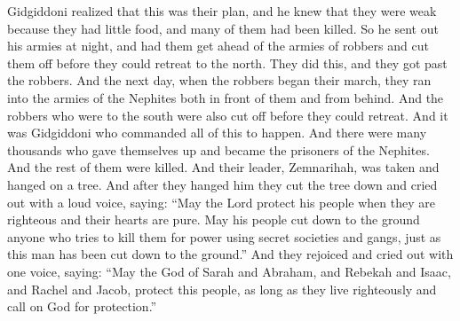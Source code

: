 Gidgiddoni realized that this was their plan, and he knew that they were weak because they had little food, and many of them had been killed. So he sent out his armies at night, and had them get ahead of the armies of robbers and cut them off before they could retreat to the north.
\bverse \iffalse And this did they do in the night-time, and got on their march beyond the robbers, so that on the morrow, when the robbers began their march, they were met by the armies of the Nephites both in their front and in their rear. \fi
They did this, and they got past the robbers. And the next day, when the robbers began their march, they ran into the armies of the Nephites both in front of them and from behind.
\bverse \iffalse And the robbers who were on the south were also cut off in their places of retreat. And all these things were done by command of Gidgiddoni. \fi
And the robbers who were to the south were also cut off before they could retreat. And it was Gidgiddoni who commanded all of this to happen.
\bverse \iffalse And there were many thousands who did yield themselves up prisoners unto the Nephites, and the remainder of them were slain. \fi
And there were many thousands who gave themselves up and became the prisoners of the Nephites. And the rest of them were killed.
\bverse \iffalse And their leader, Zemnarihah, was taken and hanged upon a tree, yea, even upon the top thereof until he was dead. And when they had hanged him until he was dead they did fell the tree to the earth, and did cry with a loud voice, saying: \fi
And their leader, Zemnarihah, was taken and hanged on a tree. And after they hanged him they cut the tree down and cried out with a loud voice, saying:
\bverse \iffalse May the Lord preserve his people in righteousness and in holiness of heart, that they may cause to be felled to the earth all who shall seek to slay them because of power and secret combinations, even as this man hath been felled to the earth. \fi
``May the Lord protect his people when they are righteous and their hearts are pure. May his people cut down to the ground anyone who tries to kill them for power using secret societies and gangs, just as this man has been cut down to the ground.''
\bverse \iffalse And they did rejoice and cry again with one voice, saying: May the God of Abraham, and the God of Isaac, and the God of Jacob, protect this people in righteousness, so long as they shall call on the name of their God for protection. \fi
And they rejoiced and cried out with one voice, saying: ``May the God of Sarah and Abraham, and Rebekah and Isaac, and Rachel and Jacob, protect this people, as long as they live righteously and call on God for protection.''
